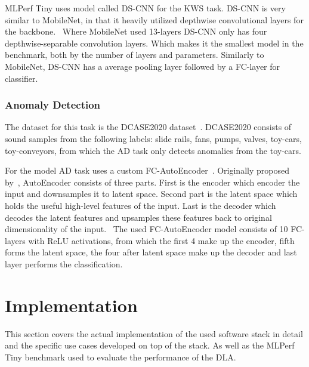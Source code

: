 \documentclass[12pt,a4paper,english
]{tunithesis}
\begin{document}
MLPerf Tiny uses model called DS-CNN for the KWS task.
DS-CNN is very similar to MobileNet, in that it heavily utilized depthwise convolutional layers for the backbone.~\cite{shaheed_ds-cnn_2022}
Where MobileNet used 13-layers DS-CNN only has four depthwise-separable convolution layers. Which makes it the smallest model in the benchmark, both by the number of layers and parameters.
Similarly to MobileNet, DS-CNN has a average pooling layer followed by a FC-layer for classifier.

\subsection{Anomaly Detection}
The dataset for this task is the DCASE2020 dataset~\cite{koizumi_description_2020}. DCASE2020 consists of sound samples from the following labels: slide rails, fans, pumps, valves, toy-cars, toy-conveyors, from which the AD task only detects anomalies from the toy-cars.

For the model AD task uses a custom FC-AutoEncoder~\cite{banbury_mlperf_2021}.
Originally proposed by~\cite{rumelhart_learning_1987}, AutoEncoder consists of three parts. First is the encoder which encoder the input and downsamples it to latent space. Second part is the latent space which holds the useful high-level features of the input. Last is the decoder which decodes the latent features and upsamples these features back to original dimensionality of the input.~\cite{chen_auto-encoders_2023} The used FC-AutoEncoder model consists of 10 FC-layers with ReLU activations, from which the first 4 make up the encoder, fifth forms the latent space, the four after latent space make up the decoder and last layer performs the classification.

\chapter{Implementation}
\label{ch:implementation}
This section covers the actual implementation of the used software stack in detail and the specific use cases developed on top of the stack. As well as the MLPerf Tiny benchmark used to evaluate the performance of the DLA.
\end{document}
